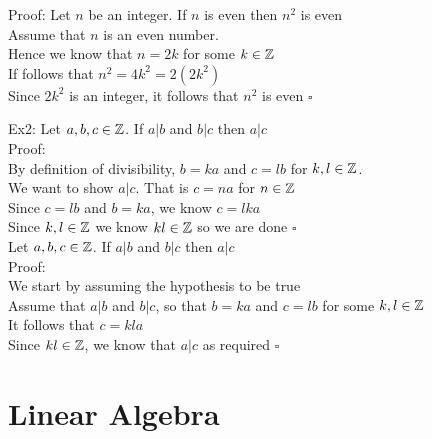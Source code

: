 \documentclass[11pt, fleqn]{article}
\begin{document}
Proof:
Let $n$ be an integer. If $n$ is even then $n^2$ is even\\
Assume that $n$ is an even number.\\
Hence we know that $n=2k$ for some $k\in\mathbb{Z}$\\
If follows that $n^2=4k^2=2(2k^2)$\\
Since $2k^2$ is an integer, it follows that $n^2$ is even $\square$

Ex2: Let $a,b,c\in\mathbb{Z}$. If $a|b$ and $b|c$ then $a|c$\\
Proof:\\
By definition of divisibility, $b=ka$ and $c=lb$ for $k,l\in\mathbb{Z}$.\\
We want to show $a|c$. That is $c=na$ for $n\in\mathbb{Z}$\\
Since $c=lb$ and $b=ka$, we know $c=lka$\\
Since $k,l\in\mathbb{Z}$ we know $kl\in\mathbb{Z}$ so we are done $\square$\\

Let $a,b,c\in\mathbb{Z}$. If $a|b$ and $b|c$ then $a|c$\\
Proof:\\
We start by assuming the hypothesis to be true\\
Assume that $a|b$ and $b|c$, so that $b=ka$ and $c=lb$ for some $k,l\in\mathbb{Z}$\\
It follows that $c=kla$\\
Since $kl\in\mathbb{Z}$, we know that $a|c$ as required $\square$










































\section{Linear Algebra}
\end{document}
